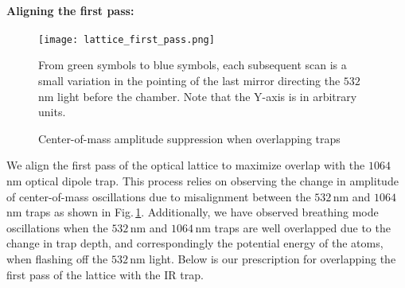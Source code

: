 \paragraph{Aligning the first pass:}
%
	\begin{figure} 
		\centerline{
		\texttt{[image: lattice\_first\_pass.png]}}
		\caption{Center-of-mass amplitude suppression when overlapping traps}{From green symbols to blue symbols, each subsequent scan is a small variation in the pointing of the last mirror directing the $532$\,nm light before the chamber. Note that the Y-axis is in arbitrary units.}
		\label{fig:latFirtPass}
	\end{figure}
We align the first pass of the optical lattice to maximize overlap with the $1064$\,nm optical dipole trap.
This process relies on observing the change in amplitude of center-of-mass oscillations due to misalignment between the $532$\,nm and $1064\,$nm traps as shown in Fig.\,\ref{fig:latFirtPass}.
Additionally, we have observed breathing mode oscillations when the $532$\,nm and $1064$\,nm traps are well overlapped due to the change in trap depth, and correspondingly the potential energy of the atoms, when flashing off the $532$\,nm light.
Below is our prescription for overlapping the first pass of the lattice with the IR trap.

